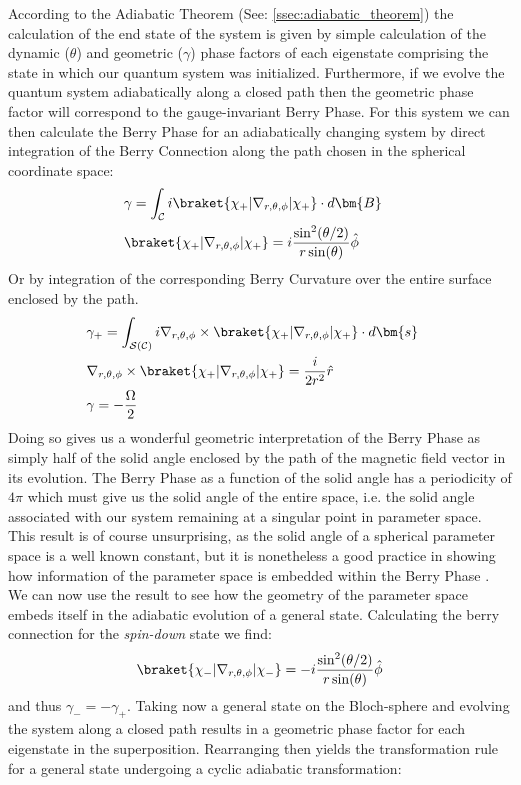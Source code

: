 \documentclass{article}
\begin{document}
According to the Adiabatic Theorem (See: \ref{ssec:adiabatic_theorem}) the calculation of the end state of the system is given by simple calculation of the dynamic ($\theta$) and geometric ($\gamma$) phase factors of each eigenstate comprising the state in which our quantum system was initialized. Furthermore, if we evolve the quantum system adiabatically along a closed path then the geometric phase factor will correspond to the gauge-invariant Berry Phase. For this system we can then calculate the Berry Phase for an adiabatically changing system by direct integration of the Berry Connection along the path chosen in the spherical coordinate space:
  \begin{align}
    &\gamma = \int_{\mathcal{C}} i \braket{\chi_{+}|\nabla_{r, \theta, \phi}|\chi_{+}} \cdot
    d\bm{B}& \label{eq:magnetic_berry_phase}\\
    &\braket{\chi_{+}|\nabla_{r, \theta, \phi}|\chi_{+}} = i \frac{\sin^{2}(\theta /
        2)}{r \sin(\theta)} \hat{\phi}
  \end{align}
Or by integration of the corresponding Berry Curvature over the entire surface enclosed by the path.
  \begin{align}
    &\nonumber \gamma_{+} = \int_{\mathcal{S}(\mathcal{C})} i \nabla_{r, \theta, \phi} \times
     \braket{\chi_{+}|\nabla_{r, \theta, \phi}|\chi_{+}} \cdot d\bm{s}&\\
    &\nonumber \nabla_{r, \theta, \phi} \times
      \braket{\chi_{+}|\nabla_{r, \theta, \phi}|\chi_{+}} = \frac{i}{2r^{2}}\hat{r}&\\
    &\gamma = -\frac{\Omega}{2}
   \end{align}
   Doing so gives us a wonderful geometric interpretation of the Berry Phase as simply half of the solid angle enclosed by the path of the magnetic field vector in its evolution. The Berry Phase as a function of the solid angle has a periodicity of $4\pi$ which must give us the solid angle of the entire space, i.e. the solid angle associated with our system remaining at a singular point in parameter space. This result is of course unsurprising, as the solid angle of a spherical parameter space is a well known constant, but it is nonetheless a good practice in showing how information of the parameter space is embedded within the Berry Phase \cite{Griffiths2017}.\\

We can now use the result to see how the geometry of the parameter space embeds itself in the adiabatic evolution of a general state. Calculating the berry connection for the \textit{spin-down} state we find:
\begin{equation*}
  \braket{\chi_{-}|\nabla_{r, \theta, \phi}|\chi_{-}} = -i \frac{\sin^{2}(\theta /
  2)}{r \sin(\theta)} \hat{\phi}
\end{equation*}
and thus $\gamma_{-} = -\gamma_{+}$. Taking now a general state on the Bloch-sphere and evolving the system along a closed path results in a geometric phase factor for each eigenstate in the superposition. Rearranging then yields the transformation rule for a general state undergoing a cyclic adiabatic transformation:
\end{document}
